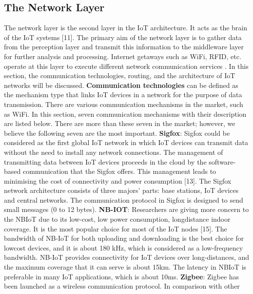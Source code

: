 \documentclass[pmlr,twocolumn,10pt]{jmlr} %
\begin{document}
\subsection{The Network Layer }
The network layer is the second layer in the IoT 
architecture. It acts as the brain of the IoT systems [11]. The 
primary aim of the network layer is to gather data from the 
perception layer and transmit this information to the 
middleware layer for further analysis and processing. 
Internet getaways such as WiFi, RFID, etc. operate at this 
layer to execute different network communication services . In this section, the communication technologies, 
routing, and the architecture of IoT networks will be 
discussed. 
\newline
\textbf{Communication technologies} can be defined as the 
mechanism type that links IoT devices in a network for the 
purpose of data transmission. There are various 
communication mechanisms in the market, such as WiFi. In 
this section, seven communication mechanisms with their 
description are listed below. There are more than these 
seven in the market; however, we believe the following 
seven are the most important.
\newline
\textbf{Sigfox}: Sigfox could be considered as the first global IoT 
network in which IoT devices can transmit data without the 
need to install any network connections. The management of 
transmitting data between IoT devices proceeds in the cloud 
by the software-based communication that the Sigfox offers. 
This management leads to minimising the cost of 
connectivity and power consumption [13]. The Sigfox 
network architecture consists of three majors’ parts: base 
stations, IoT devices and central networks. The 
communication protocol in Sigfox is designed to send small 
messages (0 to 12 bytes).
\newline
\textbf{NB-IOT}: Researchers are giving more concern to the NBIoT due to its low-cost, low power consumption, longdistance indoor coverage. It is the most popular choice for 
most of the IoT nodes [15]. The bandwidth of NB-IoT for 
both uploading and downloading is the best choice for lowcost devices, and it is about 180 kHz, which is considered as 
a low-frequency bandwidth. NB-IoT provides connectivity 
for IoT devices over long-distances, and the maximum 
coverage that it can serve is about 15km. The latency in NBIoT is preferable in many IoT applications, which is about 
10ms.
\newline 
\textbf{Zigbee}: Zigbee has been launched as a wireless 
communication protocol. In comparison with other 
\end{document}
